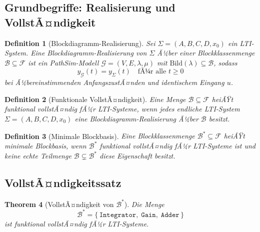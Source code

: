 ﻿\documentclass[12pt,a4paper]{article}
\newtheorem{theorem}{Theorem}[section]
\newtheorem{definition}[theorem]{Definition}
\theoremstyle{definition}
\begin{document}
\subsection{Grundbegriffe: Realisierung und VollstÃ¤ndigkeit}

\begin{definition}[Blockdiagramm-Realisierung]
\label{def:realisierung}
Sei $\Sigma = (A, B, C, D, x_0)$ ein LTI-System. Eine
\emph{Blockdiagramm-Realisierung} von $\Sigma$ Ã¼ber einer Blockklassenmenge
$\mathcal{B} \subseteq \mathcal{F}$ ist ein PathSim-Modell
$\mathcal{G} = (V, E, \lambda, \mu)$ mit $\mathrm{Bild}(\lambda) \subseteq \mathcal{B}$,
sodass
\[
  y_{\mathcal{G}}(t) = y_{\Sigma}(t) \quad \text{fÃ¼r alle } t \geq 0
\]
bei Ã¼bereinstimmenden AnfangszustÃ¤nden und identischem Eingang $u$.
\end{definition}

\begin{definition}[Funktionale VollstÃ¤ndigkeit]
\label{def:vollstaendig}
Eine Menge $\mathcal{B} \subseteq \mathcal{F}$ heiÃŸt \emph{funktional
vollstÃ¤ndig fÃ¼r LTI-Systeme}, wenn jedes endliche LTI-System
$\Sigma = (A, B, C, D, x_0)$ eine Blockdiagramm-Realisierung Ã¼ber
$\mathcal{B}$ besitzt.
\end{definition}

\begin{definition}[Minimale Blockbasis]
\label{def:basis}
Eine Blockklassenmenge $\mathcal{B}^* \subseteq \mathcal{F}$ heiÃŸt
\emph{minimale Blockbasis}, wenn $\mathcal{B}^*$ funktional vollstÃ¤ndig
fÃ¼r LTI-Systeme ist und keine echte Teilmenge
$\mathcal{B} \subsetneq \mathcal{B}^*$ diese Eigenschaft besitzt.
\end{definition}

\subsection{VollstÃ¤ndigkeitssatz}

\begin{theorem}[VollstÃ¤ndigkeit von $\mathcal{B}^*$]
\label{thm:vollstaendig}
Die Menge
\[
  \mathcal{B}^* = \bigl\{\,\texttt{Integrator},\;\texttt{Gain},\;\texttt{Adder}\,\bigr\}
\]
ist funktional vollstÃ¤ndig fÃ¼r LTI-Systeme.
\end{theorem}
\end{document}
